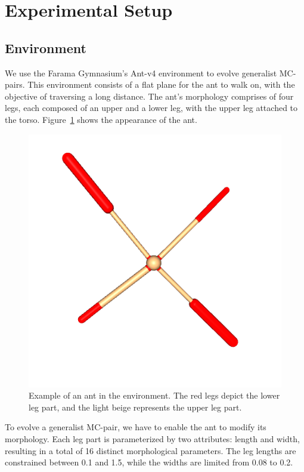 \section{Experimental Setup}
    \subsection{Environment}
        We use the Farama Gymnasium's Ant-v4 environment \cite{Gymnasium2023} to evolve generalist MC-pairs. This environment consists of a flat plane for the ant to walk on, with the objective of traversing a long distance. The ant's morphology comprises of four legs, each composed of an upper and a lower leg, with the upper leg attached to the torso. Figure~\ref{fig:ant_env} shows the appearance of the ant. 
        \begin{figure}[ht]
            \centering
            \includegraphics[width=0.9\linewidth]{./resources/ant_307.png}
            \caption{Example of an ant in the environment. The red legs depict the lower leg part, and the light beige represents the upper leg part.}
            \label{fig:ant_env}
        \end{figure}
        To evolve a generalist MC-pair, we have to enable the ant to modify its morphology. Each leg part is parameterized by two attributes: length and width, resulting in a total of 16 distinct morphological parameters. The leg lengths are constrained between 0.1 and 1.5, while the widths are limited from 0.08 to 0.2. 
        
